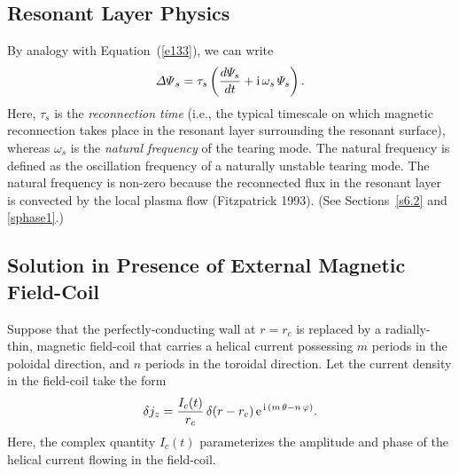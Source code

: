 \documentclass[notitlepage,12pt]{article}
\begin{document}
\subsection{Resonant Layer Physics}\label{sres}
By analogy with Equation~(\ref{e133}), we can write
\begin{equation}\label{e134}
{\mit\Delta\Psi}_s = \tau_s\left(\frac{d{\mit\Psi}_s}{dt} + {\rm i}\,\omega_s\,{\mit\Psi}_s\right).
\end{equation}
Here, $\tau_s$ is the {\em reconnection time}\/ (i.e., the typical timescale on which magnetic reconnection takes place in the
resonant layer surrounding the resonant surface), whereas $\omega_s$ is the {\em natural frequency}\/ of the tearing mode. The natural frequency is defined as the oscillation frequency of a naturally unstable tearing mode. The
natural frequency  is non-zero because the reconnected flux in the resonant layer is convected by the local plasma
flow (Fitzpatrick 1993). (See Sections~\ref{s6.2} and \ref{sphase1}.)

\subsection{Solution in Presence of External Magnetic Field-Coil}\label{sfc}
Suppose that the perfectly-conducting wall at $r=r_c$ is replaced by a radially-thin, magnetic field-coil that carries a
helical current possessing $m$ periods in the poloidal direction, and $n$ periods in the toroidal direction. Let the current density in the field-coil
take the form
\begin{equation}\label{e135}
\delta j_z = \frac{I_c(t)}{r_c}\,\delta(r-r_c)\,{\rm e}^{\,{\rm i}\,(m\,\theta-n\,\varphi)}.
\end{equation}
Here, the complex quantity $I_c(t)$ parameterizes the amplitude and phase of the helical current flowing in the field-coil. 
\end{document}
